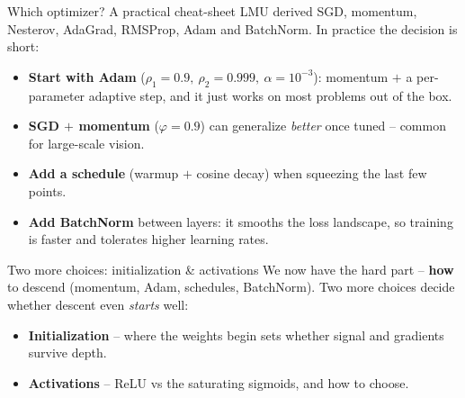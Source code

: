 \documentclass[aspectratio=43]{beamer}
\begin{document}


\begin{frame}{Which optimizer? A practical cheat-sheet}
  LMU derived SGD, momentum, Nesterov, AdaGrad, RMSProp, Adam and BatchNorm. In practice the
  decision is short:
  \vfill
  \begin{itemize}\small
    \item \textbf{Start with Adam} ($\rho_1{=}0.9,\ \rho_2{=}0.999,\ \alpha{=}10^{-3}$): momentum
      $+$ a per-parameter adaptive step, and it just works on most problems out of the box.
    \item \textbf{SGD $+$ momentum} ($\varphi{=}0.9$) can generalize \emph{better} once tuned --
      common for large-scale vision.
    \item \textbf{Add a schedule} (warmup $+$ cosine decay) when squeezing the last few points.
    \item \textbf{Add BatchNorm} between layers: it smooths the loss landscape, so training is
      faster and tolerates higher learning rates.
  \end{itemize}
  \vfill
\end{frame}

\begin{frame}{Two more choices: initialization \& activations}
  We now have the hard part -- \textbf{how} to descend (momentum, Adam, schedules, BatchNorm).
  Two more choices decide whether descent even \emph{starts} well:
  \vfill
  \begin{itemize}\small
    \item \textbf{Initialization} -- where the weights begin sets whether signal and gradients
      survive depth.
    \item \textbf{Activations} -- ReLU vs the saturating sigmoids, and how to choose.
  \end{itemize}
  \vfill
\end{frame}
\end{document}

